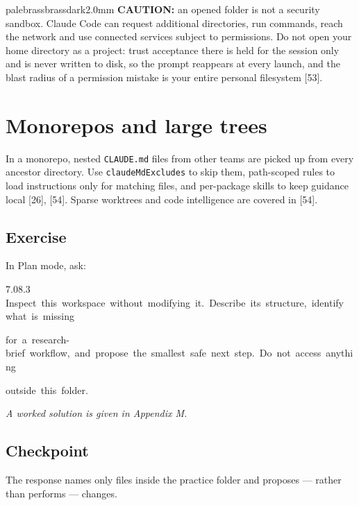 \documentclass[11pt,a4paper,twoside,openany]{book}
\newcommand{\cl}[1]{\noindent\mbox{#1}\par}
\begin{document}
\begin{calloutbox}{palebrass}{brassdark}{2.0mm}
\textbf{CAUTION:} an opened folder is not a security sandbox. Claude Code can request additional directories, run commands, reach the network and use connected services subject to permissions. Do not open your home directory as a project: trust acceptance there is held for the session only and is never written to disk, so the prompt reappears at every launch, and the blast radius of a permission mistake is your entire personal filesystem [53].
\end{calloutbox}

\FloatBarrier
\setcounter{section}{2}
\section{Monorepos and large trees}

In a monorepo, nested \texttt{CLAUDE.\allowbreak{}md} files from other teams are picked up from every ancestor directory. Use \texttt{claude\allowbreak{}Md\allowbreak{}Excludes} to skip them, path-scoped rules to load instructions only for matching files, and per-package skills to keep guidance local [26], [54]. Sparse worktrees and code intelligence are covered in [54].


\subsection*{Exercise}

In Plan mode, ask:


\begin{codeblock}{7.0}{8.3}
\cl{Inspect~this~workspace~without~modifying~it.~Describe~its~structure,~identify~what~is~missing}
\cl{for~a~research-brief~workflow,~and~propose~the~smallest~safe~next~step.~Do~not~access~anything}
\cl{outside~this~folder.}
\end{codeblock}

\emph{A worked solution is given in Appendix M.}


\subsection*{Checkpoint}

The response names only files inside the practice folder and proposes — rather than performs — changes.
\end{document}
